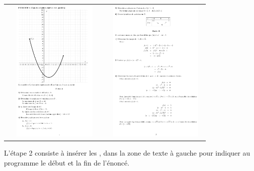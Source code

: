 \begin{center}
 \begin{tabular}{cc}
 \includegraphics[width=5cm,height=7cm]{./images/creation_exercice_02.png}
&
 \includegraphics[width=5cm,height=7cm]{./images/creation_exercice_03.png}
\end{tabular}
\end{center}


\begin{dsxl}
L'étape 2 consiste à insérer les , dans la zone de texte à gauche pour indiquer au programme le début et la fin de l'énoncé. 
\end{dsxl}

